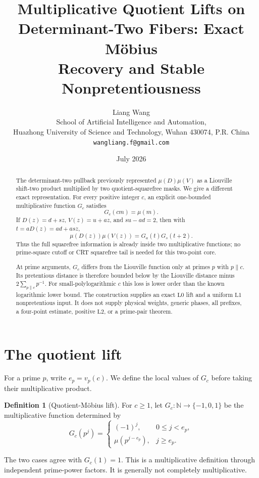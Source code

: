 \documentclass[11pt]{article}
\title{\textbf{Multiplicative Quotient Lifts on}\\
\textbf{Determinant-Two Fibers: Exact M\"obius}\\
\textbf{Recovery and Stable Nonpretentiousness}}
\author{Liang Wang\\
School of Artificial Intelligence and Automation,\\
Huazhong University of Science and Technology, Wuhan 430074, P.R. China\\
\texttt{wangliang.f@gmail.com}}
\date{July 2026}
\theoremstyle{definition}
\newtheorem{definition}[theorem]{Definition}
\theoremstyle{remark}
\newcommand{\Lzero}{\mathrm{L0}}
\newcommand{\Lone}{\mathrm{L1}}
\newcommand{\Ltwo}{\mathrm{L2}}
\newcommand{\N}{\mathbb N}
\begin{document}
\maketitle

\begin{abstract}
The determinant-two pullback previously represented
\(\mu(D)\mu(V)\) as a Liouville shift-two product multiplied by two
quotient-squarefree masks.  We give a different exact
representation.  For every positive integer \(c\), an explicit
one-bounded multiplicative function \(G_c\) satisfies
\[
 G_c(cm)=\mu(m).
\]
If \(D(z)=d+sz\), \(V(z)=u+az\), and \(su-ad=2\), then with
\(t=aD(z)=ad+asz\),
\[
 \mu(D(z))\mu(V(z))=G_a(t)G_s(t+2).
\]
Thus the full squarefree information is already inside two
multiplicative functions; no prime-square cutoff or CRT squarefree
tail is needed for this two-point core.

At prime arguments, \(G_c\) differs from the Liouville function only
at primes \(p\) with \(p\parallel c\).  Its pretentious distance is
therefore bounded below by the Liouville distance minus
\(2\sum_{p\parallel c}p^{-1}\).  For small-polylogarithmic \(c\) this
loss is lower order than the known logarithmic lower bound.  The
construction supplies an exact \(\Lzero\) lift and a uniform
\(\Lone\) nonpretentious input.  It does not supply physical weights,
generic phases, all prefixes, a four-point estimate, positive
\(\Ltwo\), or a prime-pair theorem.
\end{abstract}

\section{The quotient lift}

For a prime \(p\), write \(e_p=v_p(c)\).  We define the local values
of \(G_c\) before taking their multiplicative product.

\begin{definition}[Quotient-M\"obius lift]
\label{def:Gc}
For \(c\ge1\), let \(G_c:\N\to\{-1,0,1\}\) be the multiplicative
function determined by
\begin{equation}
 G_c(p^j)=
 \begin{cases}
  (-1)^j,&0\le j<e_p,\\
  \mu(p^{j-e_p}),&j\ge e_p.
 \end{cases}
\label{eq:local}
\end{equation}
\end{definition}

The two cases agree with \(G_c(1)=1\).  This is a multiplicative
definition through independent prime-power factors.  It is generally
not completely multiplicative.
\end{document}
